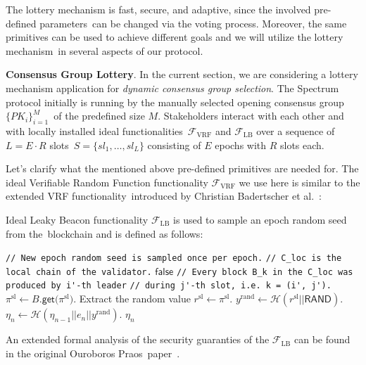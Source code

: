 The lottery mechanism is fast, secure, and adaptive, since the involved pre-defined parameters\
can be changed via the voting process.
Moreover, the same primitives can be used to achieve different goals and we will utilize the lottery mechanism\
in several aspects of our protocol.

\textbf{Consensus Group Lottery}.
In the current section, we are considering a lottery mechanism application for \emph{dynamic consensus group selection}.
The Spectrum protocol initially is running by the manually selected opening consensus group $\{PK_i\}_{i=1}^M$\
of the predefined size $M$.
Stakeholders interact with each other and with locally installed ideal functionalities\
$\mathcal{F}_{\text{VRF}}$ and $\mathcal{F}_{\text{LB}}$ over a sequence of $L = E \cdot R$ slots\
${S=\{sl_1,\dots,sl_L\}}$ consisting of $E$ epochs with $R$ slots each.

Let's clarify what the mentioned above pre-defined primitives are needed for.
The ideal Verifiable Random Function functionality ${\mathcal{F}}_{\text{VRF}}$ we use here is similar to the extended VRF functionality\
introduced by Christian Badertscher et al.~\cite{cryptoeprint:2022/1045}:

Ideal Leaky Beacon functionality $\mathcal{F}_{\text{LB}}$ is used to sample an epoch random seed from the\
blockchain and is defined as follows:
\begin{functionality}
    \caption{${\mathcal{F}_{\text{LB}}(e_n, C_{\text{loc}})}$}
    \begin{algorithmic}[1]
        \State \lstinline|// New epoch random seed is sampled once per epoch.|
        \State \lstinline|// C_loc is the local chain of the validator.|
        \If{${e_n < 2}$}
            \State \Return ${\textsf{false}}$
        \EndIf
            \State \lstinline|// Every block B_k in the C_loc was produced by i'-th leader|
            \State \lstinline|// during j'-th slot, i.e. k = (i', j').|
            \State ${\pi^{\text{sl}} \leftarrow B\textsf{.get(}\pi^{\text{sl}}\textsf{)}}$.
            \State Extract the random value ${r^{\text{sl}} \leftarrow \pi^{\text{sl}}}$.
            \State $y^{\text{rand}} \leftarrow \mathcal{H}(r^{\text{sl}} || \textsf{RAND})$.
            \State ${\eta_n \leftarrow \mathcal{H}(\eta_{n - 1} || e_n || y^{\text{rand}})}$.
        \EndFor
        \State \Return $\eta_n$
    \end{algorithmic}
\end{functionality}
An extended formal analysis of the security guaranties of the ${\mathcal{F}}_{\text{LB}}$ can be found in the original Ouroboros Praos\
paper~\cite{cryptoeprint:2017/573}.

